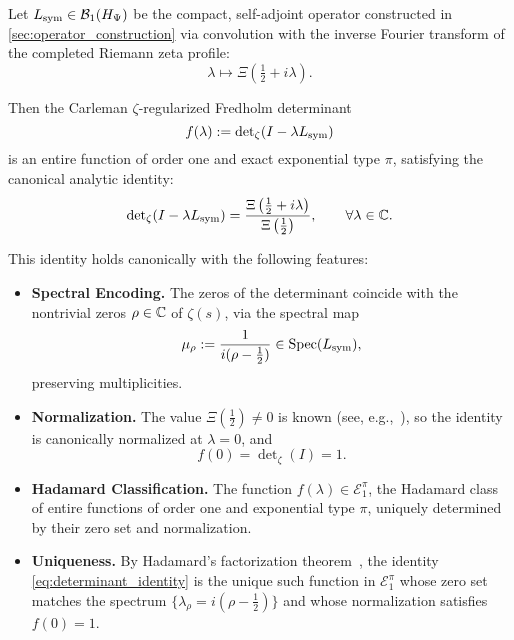 \begin{theorem}
\label{thm:det_identity_revised}
\leavevmode
\begin{tcolorbox}[colback=gray!3!white,colframe=black!75!white,title={\textbf{Canonical Determinant Identity}}]
Let \( L_{\mathrm{sym}} \in \mathcal{B}_1(H_{\Psi}) \) be the compact, self-adjoint operator constructed in \cref{sec:operator_construction} via convolution with the inverse Fourier transform of the completed Riemann zeta profile:
\[
\lambda \mapsto \Xi\left( \tfrac{1}{2} + i\lambda \right).
\]

\medskip

Then the Carleman \(\zeta\)-regularized Fredholm determinant
\[
f(\lambda) := \det\nolimits_\zeta(I - \lambda L_{\mathrm{sym}})
\]
is an entire function of order one and exact exponential type \( \pi \), satisfying the canonical analytic identity:
\begin{equation}
\det\nolimits_\zeta(I - \lambda L_{\mathrm{sym}})
= \frac{\Xi\left( \tfrac{1}{2} + i\lambda \right)}{\Xi\left( \tfrac{1}{2} \right)},
\qquad \forall \lambda \in \mathbb{C}.
\label{eq:determinant_identity}
\end{equation}

\medskip

This identity holds canonically with the following features:
\begin{itemize}
  \item \textbf{Spectral Encoding.} The zeros of the determinant coincide with the nontrivial zeros \( \rho \in \mathbb{C} \) of \( \zeta(s) \), via the spectral map
  \[
  \mu_\rho := \frac{1}{i(\rho - \tfrac{1}{2})} \in \operatorname{Spec}(L_{\mathrm{sym}}),
  \]
  preserving multiplicities.

  \item \textbf{Normalization.} The value \( \Xi(\tfrac{1}{2}) \ne 0 \) is known (see, e.g.,~\cite[Thm.~2.3]{Titchmarsh1986Zeta}), so the identity is canonically normalized at \( \lambda = 0 \), and
  \[
  f(0) = \det\nolimits_\zeta(I) = 1.
  \]

  \item \textbf{Hadamard Classification.} The function \( f(\lambda) \in \mathcal{E}_1^\pi \), the Hadamard class of entire functions of order one and exponential type \( \pi \), uniquely determined by their zero set and normalization.

  \item \textbf{Uniqueness.} By Hadamard’s factorization theorem~\cite[Ch.~3]{Levin1996EntireLectures}, the identity \eqref{eq:determinant_identity} is the unique such function in \( \mathcal{E}_1^\pi \) whose zero set matches the spectrum \( \{ \lambda_\rho = i(\rho - \tfrac{1}{2}) \} \) and whose normalization satisfies \( f(0) = 1 \).
\end{itemize}
\end{tcolorbox}
\end{theorem}
